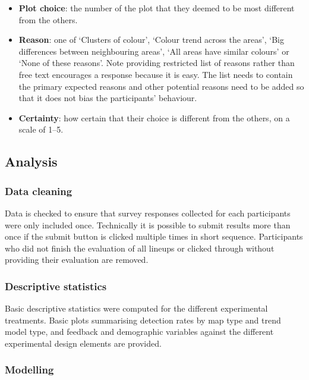 \documentclass[
doublespace,
  times]{anzsauth}
\providecommand{\tightlist}{%
  \setlength{\itemsep}{0pt}\setlength{\parskip}{0pt}}
\begin{document}
\begin{itemize}
\tightlist
\item
  \textbf{Plot choice}: the number of the plot that they deemed to be
  most different from the others.
\item
  \textbf{Reason}: one of `Clusters of colour', `Colour trend across the
  areas', `Big differences between neighbouring areas', `All areas have
  similar colours' or `None of these reasons'. Note providing restricted
  list of reasons rather than free text encourages a response because it
  is easy. The list needs to contain the primary expected reasons and
  other potential reasons need to be added so that it does not bias the
  participants' behaviour.
\item
  \textbf{Certainty}: how certain that their choice is different from
  the others, on a scale of 1--5.
\end{itemize}

\subsection{Analysis}\label{analysis}

\subsubsection{Data cleaning}\label{data-cleaning}

Data is checked to ensure that survey responses collected for each
participants were only included once. Technically it is possible to
submit results more than once if the submit button is clicked multiple
times in short sequence. Participants who did not finish the evaluation
of all lineups or clicked through without providing their evaluation are
removed.

\subsubsection{Descriptive statistics}\label{descriptive-statistics}

Basic descriptive statistics were computed for the different
experimental treatments. Basic plots summarising detection rates by map
type and trend model type, and feedback and demographic variables
against the different experimental design elements are provided.

\subsubsection{Modelling}\label{modelling}
\end{document}
